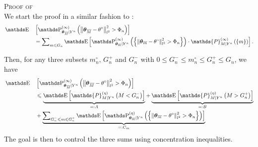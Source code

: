 \begin{pro}{\textsc{Proof of } \\}\label{PRO_BAYES_STRATEGIES_EXPOLIM}
We start the proof in a similar fashion to :
\begin{alignat*}{2}
& \E && \left[\P^{(\infty)}_{\boldsymbol{\theta}_{\overline{M}} \vert Y^{n}}\left(\left\Vert \boldsymbol{\theta}_{\overline{M}} - \theta^{\circ}\right\Vert_{l^{2}}^{2} > \Phi_{n} \right)\right]\\
& && = \sum\nolimits_{m \leq G_{n}}\E\left[\P^{(\infty)}_{\boldsymbol{\theta}_{\overline{m}} \vert Y^{n}}\left(\left\{\left\Vert \boldsymbol{\theta}_{\overline{m}} - \theta^{\circ} \right\Vert_{l^{2}}^{2} > \Phi_{n}\right\}\right) \cdot \mathds{P}_{M \vert Y^{n}}^{(\infty)}\left(\{m\}\right)\right].
\end{alignat*}

Then, for any three subsets $m^{\circ}_{n}$, $G^{+}_{n}$ and $G^{-}_{n}$ with $0 \leq G^{-}_{n} \leq m^{\circ}_{n} \leq G^{+}_{n} \leq G_{n}$, we have
\begin{alignat*}{2}
& \E&&\left[\P^{(\infty)}_{\boldsymbol{\theta}_{\overline{M}} \vert Y^{n}}\left(\left\Vert \boldsymbol{\theta}_{\overline{M}} - \theta^{\circ}\right\Vert_{l^{2}}^{2} > \Phi_{n} \right)\right]\\
& && \leq\underbrace{\E\left[\mathds{P}_{M \vert Y^{n}}^{(\eta)}\left(M < G^{-}_{n}\right)\right]}_{=: A} + \underbrace{\E\left[\mathds{P}_{M \vert Y^{n}}^{(\eta)}\left(M > G^{+}_{n}\right)\right]}_{=: B}\\
& && + \underbrace{\sum\nolimits_{G^{-}_{n} \leq m \leq G^{+}_{n}}\E\left[\P^{(\eta)}_{\boldsymbol{\theta}_{\overline{m}} \vert Y^{n}}\left(\left\{\left\Vert \boldsymbol{\theta}_{\overline{m}} - \theta^{\circ} \right\Vert_{l^{2}}^{2} > \Phi_{n}\right\}\right)\right]}_{=:C_{m}}
\end{alignat*}
The goal is then to control the three sums using concentration inequalities.


\end{pro}
